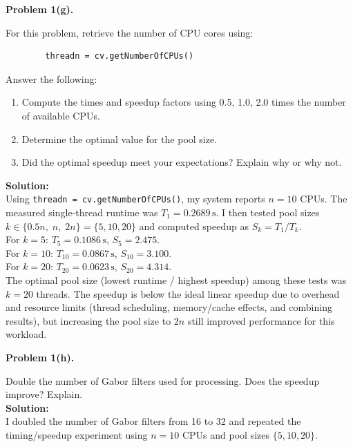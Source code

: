 \documentclass[11pt]{article}
\begin{document}
	\newpage
	\textbf{Problem 1(g).}
	
	For this problem, retrieve the number of CPU cores using:
	\begin{verbatim}
		threadn = cv.getNumberOfCPUs()
	\end{verbatim}
	
	Answer the following:
	
	\begin{enumerate}
		\item[i.] Compute the times and speedup factors using 0.5, 1.0, 2.0 times the number of available CPUs.
		\item[ii.] Determine the optimal value for the pool size.
		\item[iii.] Did the optimal speedup meet your expectations? Explain why or why not.
	\end{enumerate}
	
	\textbf{Solution:}\\
	Using \texttt{threadn = cv.getNumberOfCPUs()}, my system reports $n=10$ CPUs. The measured single-thread runtime was $T_{1}=0.2689\,\text{s}$. I then tested pool sizes $k \in \{0.5n,\; n,\; 2n\}=\{5,10,20\}$ and computed speedup as $S_k=T_{1}/T_{k}$.\\
	
	For $k=5$: $T_{5}=0.1086\,\text{s}$, $S_{5}=2.475$.\\
	For $k=10$: $T_{10}=0.0867\,\text{s}$, $S_{10}=3.100$.\\
	For $k=20$: $T_{20}=0.0623\,\text{s}$, $S_{20}=4.314$.\\
	
	The optimal pool size (lowest runtime / highest speedup) among these tests was $k=20$ threads. The speedup is below the ideal linear speedup due to overhead and resource limits (thread scheduling, memory/cache effects, and combining results), but increasing the pool size to $2n$ still improved performance for this workload.
	
	\newpage
	
	\textbf{Problem 1(h).}
	
	Double the number of Gabor filters used for processing. Does the speedup improve? Explain.\\
	
	\textbf{Solution:}\\
	I doubled the number of Gabor filters from 16 to 32 and repeated the timing/speedup experiment using $n=10$ CPUs and pool sizes $\{5,10,20\}$.\\
	
\end{document}
